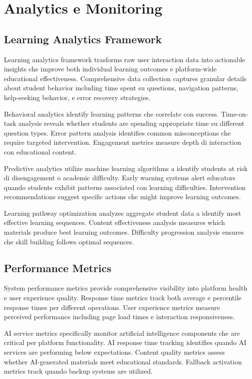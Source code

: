 \documentclass[12pt,a4paper]{article}
\begin{document}
\section{Analytics e Monitoring}

\subsection{Learning Analytics Framework}

Learning analytics framework trasforms raw user interaction data into actionable insights che improve both individual learning outcomes e platform-wide educational effectiveness. Comprehensive data collection captures granular details about student behavior including time spent su questions, navigation patterns, help-seeking behavior, e error recovery strategies.

Behavioral analytics identify learning patterns che correlate con success. Time-on-task analysis reveals whether students are spending appropriate time su different question types. Error pattern analysis identifies common misconceptions che require targeted intervention. Engagement metrics measure depth di interaction con educational content.

Predictive analytics utilize machine learning algorithms a identify students at risk di disengagement o academic difficulty. Early warning systems alert educators quando students exhibit patterns associated con learning difficulties. Intervention recommendations suggest specific actions che might improve learning outcomes.

Learning pathway optimization analyzes aggregate student data a identify most effective learning sequences. Content effectiveness analysis measures which materials produce best learning outcomes. Difficulty progression analysis ensures che skill building follows optimal sequences.

\subsection{Performance Metrics}

System performance metrics provide comprehensive visibility into platform health e user experience quality. Response time metrics track both average e percentile response times per different operations. User experience metrics measure perceived performance including page load times e interaction responsiveness.

AI service metrics specifically monitor artificial intelligence components che are critical per platform functionality. AI response time tracking identifies quando AI services are performing below expectations. Content quality metrics assess whether AI-generated materials meet educational standards. Fallback activation metrics track quando backup systems are utilized.
\end{document}
